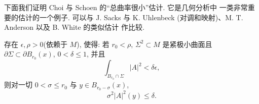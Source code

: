 下面我们证明 Choi 与 Schoen \cite{CiSc} 的``总曲率很小''估计. 它是几何分析中
一类非常重要的估计的一个例子. 可以与 J. Sacks 与 K. Uhlenbeck \cite{SaUh}
(对调和映射)、M. T. Anderson \cite{An} 以及 B. White \cite{Wh1} 的类似估计
作比较.

\begin{theorem}
\label{thm:2.2}
存在 $\epsilon,\rho>0$(依赖于 $M$), 使得: 若 $r_0<\rho$, $\Sigma^2\subset M$
是紧极小曲面且 $\partial\Sigma\subset\partial B_{r_0}(x)$, $0<\delta\leq1$, 并且
\begin{equation}
\int_{B_{r_0}\cap\Sigma}|A|^{2}<\delta\epsilon,
\label{eq:2.30}
\end{equation}
则对一切 $0<\sigma\leq r_0$ 与 $y\in B_{r_0-\sigma}(x)$,
\begin{equation}
\sigma^{2}|A|^{2}(y)\leq\delta.
\label{eq:2.31}
\end{equation}
\end{theorem}

